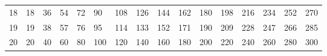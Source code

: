 \begin{table}[]
\begin{tabular}{|l|lllllllllllllll}
18                      & 18                     & 36                     & 54                     & 72                     & 90                     & 108                    & 126                    & 144                    & 162                    & 180                     & 198                     & 216                     & 234                     & 252                     & 270                     \\ \cline{1-1}
19                      & 19                     & 38                     & 57                     & 76                     & 95                     & 114                    & 133                    & 152                    & 171                    & 190                     & 209                     & 228                     & 247                     & 266                     & 285                     \\ \cline{1-1}
20                      & 20                     & 40                     & 60                     & 80                     & 100                    & 120                    & 140                    & 160                    & 180                    & 200                     & 220                     & 240                     & 260                     & 280                     & 300                     \\ \cline{1-1}
\end{tabular}
\label{tab:mnozenie_jk}
\end{table}